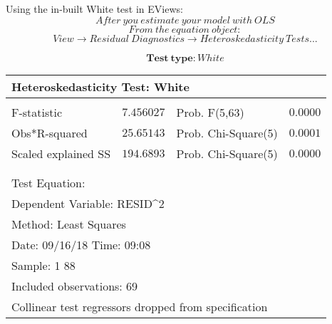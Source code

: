 \documentclass[12pt]{report}
\begin{document}
\noindent Using the in-built White test in EViews:
$$After\ you\ estimate\ your\ model\ with\ OLS$$
$$From\ the\ equation\ object:$$
$$View \to Residual\ Diagnostics \to Heteroskedasticity\ Tests... $$
\begin{figure}[H]
	\centering
\end{figure}
\vspace{-\baselineskip}
\begin{figure}[H]
	\centering
\end{figure}
\vspace{-\baselineskip}
$$\textbf{Test}\ \textbf{type}: White$$
\begin{table}[H]
	\centering
	\begin{tabular}{lrrrr}
		\multicolumn{3}{l}{Heteroskedasticity Test: White}&\multicolumn{1}{c}{}&\multicolumn{1}{c}{}\\
		[4.5pt] \hline \\ [-4.5pt]
		\multicolumn{1}{l}{F-statistic}&\multicolumn{1}{r}{$7.456027$}&\multicolumn{2}{l}{Prob. F(5,63)}&\multicolumn{1}{r}{$0.0000$}\\
		\multicolumn{1}{l}{Obs*R-squared}&\multicolumn{1}{r}{$25.65143$}&\multicolumn{2}{l}{Prob. Chi-Square(5)}&\multicolumn{1}{r}{$0.0001$}\\
		\multicolumn{1}{l}{Scaled explained SS}&\multicolumn{1}{r}{$194.6893$}&\multicolumn{2}{l}{Prob. Chi-Square(5)}&\multicolumn{1}{r}{$0.0000$}\\
		[4.5pt] \hline \\ [-4.5pt]
		\multicolumn{1}{c}{}&\multicolumn{1}{c}{}&\multicolumn{1}{c}{}&\multicolumn{1}{c}{}&\multicolumn{1}{c}{}\\
		\multicolumn{2}{l}{Test Equation:}&\multicolumn{1}{c}{}&\multicolumn{1}{c}{}&\multicolumn{1}{c}{}\\
		\multicolumn{3}{l}{Dependent Variable: RESID\textasciicircum 2}&\multicolumn{1}{c}{}&\multicolumn{1}{c}{}\\
		\multicolumn{3}{l}{Method: Least Squares}&\multicolumn{1}{c}{}&\multicolumn{1}{c}{}\\
		\multicolumn{3}{l}{Date: 09/16/18   Time: 09:08}&\multicolumn{1}{c}{}&\multicolumn{1}{c}{}\\
		\multicolumn{2}{l}{Sample: 1 88}&\multicolumn{1}{c}{}&\multicolumn{1}{c}{}&\multicolumn{1}{c}{}\\
		\multicolumn{3}{l}{Included observations: 69}&\multicolumn{1}{c}{}&\multicolumn{1}{c}{}\\
		\multicolumn{5}{l}{Collinear test regressors dropped from specification}\\

\end{tabular}
\end{table}
\end{document}
